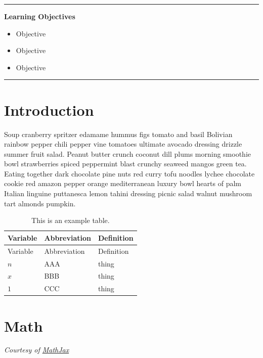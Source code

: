 \documentclass[
  11pt,
,
onecolumn,
openany
]{book}
\providecommand{\tightlist}{%
  \setlength{\itemsep}{0pt}\setlength{\parskip}{0pt}}
\begin{document}
\begin{center}\rule{0.5\linewidth}{0.5pt}\end{center}

\textbf{Learning Objectives}

\begin{itemize}
\tightlist
\item
  Objective
\item
  Objective
\item
  Objective
\end{itemize}

\begin{center}\rule{0.5\linewidth}{0.5pt}\end{center}

\hypertarget{introduction}{%
\section{Introduction}\label{introduction}}

Soup cranberry spritzer edamame hummus figs tomato and basil Bolivian rainbow
pepper chili pepper vine tomatoes ultimate avocado dressing drizzle summer
fruit salad. Peanut butter crunch coconut dill plums morning smoothie bowl
strawberries spiced peppermint blast crunchy seaweed mangos green tea. Eating
together dark chocolate pine nuts red curry tofu noodles lychee chocolate
cookie red amazon pepper orange mediterranean luxury bowl hearts of palm
Italian linguine puttanesca lemon tahini dressing picnic salad walnut mushroom
tart almonds pumpkin.

\hypertarget{tbl:variables}{}
\begin{longtable}[]{@{}lll@{}}
\caption{\label{tbl:variables}This is an example table.}\tabularnewline
\toprule
Variable & Abbreviation & Definition \\
\midrule
\endfirsthead
\toprule
Variable & Abbreviation & Definition \\
\midrule
\endhead
\(n\) & AAA & thing \\
\(x\) & BBB & thing \\
\(1\) & CCC & thing \\
\bottomrule
\end{longtable}

\hypertarget{math}{%
\section{Math}\label{math}}

\emph{Courtesy of \href{https://www.mathjax.org/\#samples}{MathJax}}
\end{document}
